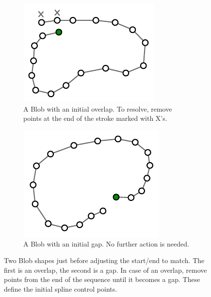 \begin{figure}
  \centering
  \begin{subfigure}[t]{0.42\textwidth}
    \includegraphics[width=\linewidth]{img/blob-overlap.pdf}
    \caption{A Blob with an initial overlap. To resolve, remove points
      at the end of the stroke marked with X's.}
    \label{fig:blob-overlap}
  \end{subfigure}
  \hspace{1cm} %
  \begin{subfigure}[t]{0.42\textwidth}
    \includegraphics[width=\linewidth]{img/blob-gap.pdf}
    \caption{A Blob with an initial gap. No further action is needed.}
    \label{fig:blob-gap}
  \end{subfigure}
  \caption[Blobs: Overlap vs. Gap]{Two Blob shapes just before
    adjusting the start/end to match. The first is an overlap, the
    second is a gap. In case of an overlap, remove points from the end
    of the sequence until it becomes a gap. These define the initial
    spline control points.}
  \label{fig:blob}
\end{figure}
